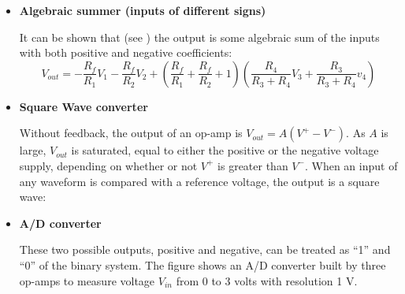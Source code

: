 \begin{itemize}

\item {\bf Algebraic summer (inputs of different signs)}


  
  
  \begin{comment}
  Define $V\stackrel{\triangle}{=}V^+ \approx V^- $. Apply KCL to $V^-$ and
  $V^+$ we get:
  \[
  \frac{V_1-V}{R_1}+\frac{V_2-V}{R_2}+\frac{V_{out}-V}{R_f}=0,\;\;\;\;\;\;
  \mbox{and}\;\;\;\;\;\;\;\;
  \frac{V_3-V}{R_3}+\frac{V_4-V}{R_4}=0 
  \]
  Solving the 2nd equation for $V$ we get:
  \[
  V=\frac{R_4}{R_3+R_4} V_3 + \frac{R_3}{R_3+R_4} V_4	
  \]
  and substitute it into the first equation to get
  \[
  V_{out}=-\frac{R_f}{R_1}V_1-\frac{R_f}{R_2}V_2
  +\left(\frac{R_f}{R_1}+\frac{R_f}{R_2}+1\right)
  \left(\frac{R_4}{R_3+R_4} V_3+\frac{R_3}{R_3+R_4} v_4\right) 
  \]
  \end{comment}

  It can be shown that (see )
  the output is some algebraic sum of the inputs with both positive and
  negative coefficients:
  \[
  V_{out}=-\frac{R_f}{R_1}V_1-\frac{R_f}{R_2}V_2
  +\left(\frac{R_f}{R_1}+\frac{R_f}{R_2}+1\right)
  \left(\frac{R_4}{R_3+R_4} V_3+\frac{R_3}{R_3+R_4} v_4\right) 
  \]

\item {\bf Square Wave converter}

  Without feedback, the output of an op-amp is $V_{out}=A(V^+-V^-)$. As $A$ is
  large, $V_{out}$ is saturated, equal to either the positive or the negative
  voltage supply, depending on whether or not $V^+$ is greater than $V^-$. 
  When an input of any waveform is compared with a reference voltage, the
  output is a square wave:



\item {\bf A/D converter}

  These two possible outputs, positive and negative, can be treated as ``1'' 
  and ``0'' of the binary system. The figure shows an A/D converter built by
  three op-amps to measure voltage $V_{in}$ from 0 to 3 volts with resolution 
  1 V.


\end{itemize}
